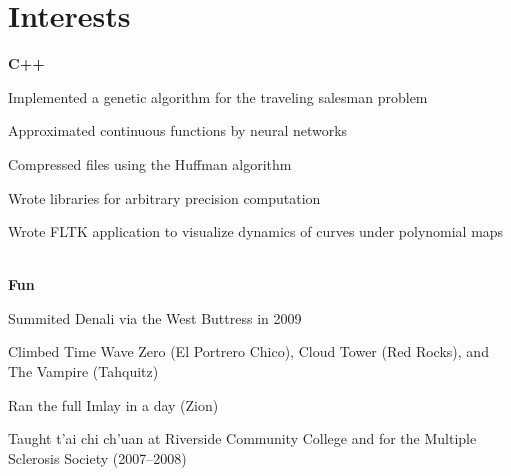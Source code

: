 \documentclass[11pt]{article}
\begin{document}
\section*{Interests}
\noindent\textbf{C++}
\begin{inparaitem}
\item Implemented a genetic algorithm for the traveling salesman problem
\item Approximated continuous functions by neural networks
\item Compressed files using the Huffman algorithm
\item Wrote libraries for arbitrary precision computation
\item Wrote FLTK application to visualize dynamics of curves under polynomial maps
\end{inparaitem}
\\
\noindent\textbf{Fun}
\begin{inparaitem}
\item Summited Denali via the West Buttress in 2009
\item Climbed Time Wave Zero (El Portrero Chico), Cloud Tower (Red Rocks), and The Vampire (Tahquitz)
\item Ran the full Imlay in a day (Zion)
\item Taught t'ai chi ch'uan at Riverside Community College and for the Multiple Sclerosis Society (2007--2008)
\end{inparaitem}
\end{document}
